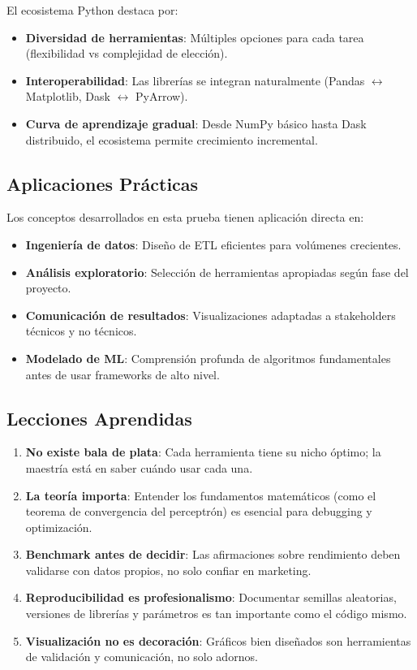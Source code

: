 \documentclass[12pt]{src/formato_utem}
\begin{document}
El ecosistema Python destaca por:
\begin{itemize}
    \item \textbf{Diversidad de herramientas}: Múltiples opciones para cada tarea (flexibilidad vs complejidad de elección).
    \item \textbf{Interoperabilidad}: Las librerías se integran naturalmente (Pandas $\leftrightarrow$ Matplotlib, Dask $\leftrightarrow$ PyArrow).
    \item \textbf{Curva de aprendizaje gradual}: Desde NumPy básico hasta Dask distribuido, el ecosistema permite crecimiento incremental.
\end{itemize}

\subsection{Aplicaciones Prácticas}

Los conceptos desarrollados en esta prueba tienen aplicación directa en:
\begin{itemize}
    \item \textbf{Ingeniería de datos}: Diseño de ETL eficientes para volúmenes crecientes.
    \item \textbf{Análisis exploratorio}: Selección de herramientas apropiadas según fase del proyecto.
    \item \textbf{Comunicación de resultados}: Visualizaciones adaptadas a stakeholders técnicos y no técnicos.
    \item \textbf{Modelado de ML}: Comprensión profunda de algoritmos fundamentales antes de usar frameworks de alto nivel.
\end{itemize}

\subsection{Lecciones Aprendidas}

\begin{enumerate}
    \item \textbf{No existe bala de plata}: Cada herramienta tiene su nicho óptimo; la maestría está en saber cuándo usar cada una.
    
    \item \textbf{La teoría importa}: Entender los fundamentos matemáticos (como el teorema de convergencia del perceptrón) es esencial para debugging y optimización.
    
    \item \textbf{Benchmark antes de decidir}: Las afirmaciones sobre rendimiento deben validarse con datos propios, no solo confiar en marketing.
    
    \item \textbf{Reproducibilidad es profesionalismo}: Documentar semillas aleatorias, versiones de librerías y parámetros es tan importante como el código mismo.
    
    \item \textbf{Visualización no es decoración}: Gráficos bien diseñados son herramientas de validación y comunicación, no solo adornos.
\end{enumerate}
\end{document}
